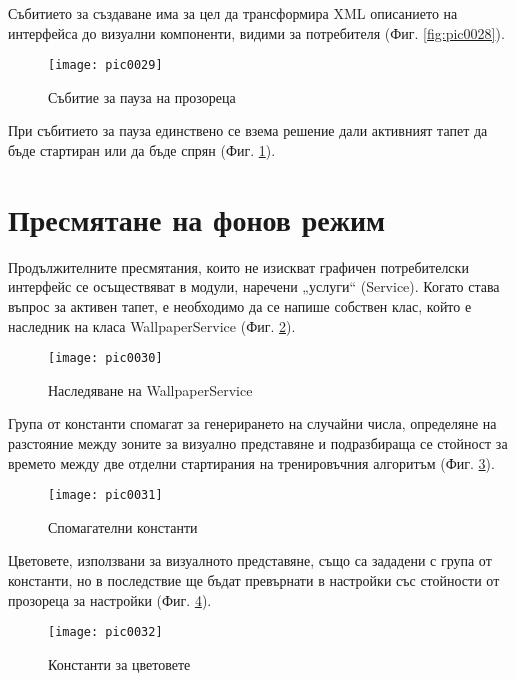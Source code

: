 Събитието за създаване има за цел да трансформира XML описанието на интерфейса до визуални компоненти, видими за потребителя (Фиг. \ref{fig:pic0028}). 

\begin{figure}[h]
  \centering
  \texttt{[image: pic0029]}
  \caption{Събитие за пауза на прозореца}
\label{fig:pic0029}
\end{figure}
\FloatBarrier

При събитието за пауза единствено се взема решение дали активният тапет да бъде стартиран или да бъде спрян (Фиг. \ref{fig:pic0029}). 

\section{Пресмятане на фонов режим}

Продължителните пресмятания, които не изискват графичен потребителски интерфейс се осъществяват в модули, наречени „услуги“ (Service). Когато става въпрос за активен тапет, е необходимо да се напише собствен клас, който е наследник на класа WallpaperService (Фиг. \ref{fig:pic0030}).

\begin{figure}[h]
  \centering
  \texttt{[image: pic0030]}
  \caption{Наследяване на WallpaperService}
\label{fig:pic0030}
\end{figure}
\FloatBarrier

Група от константи спомагат за генерирането на случайни числа, определяне на разстояние между зоните за визуално представяне и подразбираща се стойност за времето между две отделни стартирания на тренировъчния алгоритъм (Фиг. \ref{fig:pic0031}). 

\begin{figure}[h]
  \centering
  \texttt{[image: pic0031]}
  \caption{Спомагателни константи}
\label{fig:pic0031}
\end{figure}
\FloatBarrier

Цветовете, използвани за визуалното представяне, също са зададени с група от константи, но в последствие ще бъдат превърнати в настройки със стойности от прозореца за настройки (Фиг. \ref{fig:pic0032}).

\begin{figure}[h]
  \centering
  \texttt{[image: pic0032]}
  \caption{Константи за цветовете}
\label{fig:pic0032}
\end{figure}
\FloatBarrier

